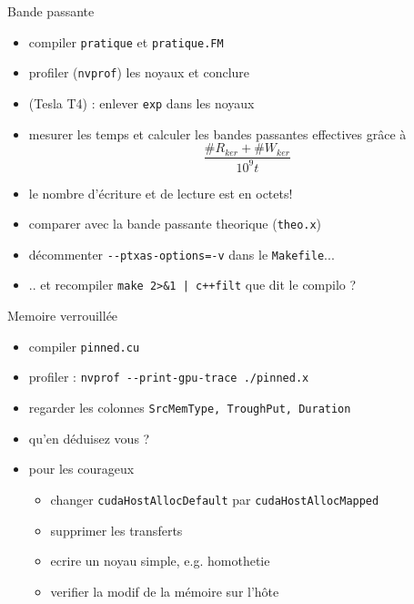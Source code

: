 \documentclass[11pt,mathserif]{beamer}
\newcommand{\scout}{\faAngellist}
\newcommand{\gezi}{\faLongArrowRight}
\newcommand{\galde}{\faQuestion}
\newcommand{\hand}{\faHandORight}
\newcommand{\argi}{\faLightbulbO}
\newcommand{\kontuz}{\faExclamationTriangle}
\newcommand{\adibi}{\faCommentO}
\begin{document}
\begin{frame}{Bande passante}
\begin{itemize}
  \item[\adibi] compiler \texttt{pratique} et  \texttt{pratique.FM} 
  \item[\galde] profiler (\texttt{nvprof}) les noyaux et conclure
  \item[\hand] (Tesla T4) : enlever \texttt{exp} dans les noyaux 
  \item[\faClockO] mesurer les temps et calculer les bandes passantes effectives grâce à
$$ \frac{\#R_{ker} + \#W_{ker}}{10^9t} $$
 \item[\kontuz] le nombre d'écriture et de lecture est en octets!
  \item comparer avec la bande passante theorique (\texttt{theo.x})
  \item[\argi] décommenter \lstinline$--ptxas-options=-v$ dans le \texttt{Makefile}...
  \item .. et recompiler \lstinline$make 2>&1 | c++filt$ \gezi que dit le compilo ?
\end{itemize}
\end{frame}

\begin{frame}{Memoire verrouillée}
\begin{itemize}
  \item[\adibi] compiler \texttt{pinned.cu}
  \item[\faClockO] profiler : \lstinline$nvprof --print-gpu-trace ./pinned.x$
  \item[\kontuz] regarder les colonnes \texttt{SrcMemType, TroughPut, Duration }
  \item[\galde] qu'en déduisez vous ?
  \item[\scout] pour les courageux
  \begin{itemize}
    \item changer \texttt{cudaHostAllocDefault} par \texttt{cudaHostAllocMapped}
    \item supprimer les transferts
    \item ecrire un noyau simple, e.g. homothetie
    \item verifier la modif de la mémoire sur l'hôte
  \end{itemize}
\end{itemize}
\end{frame}
\end{document}
